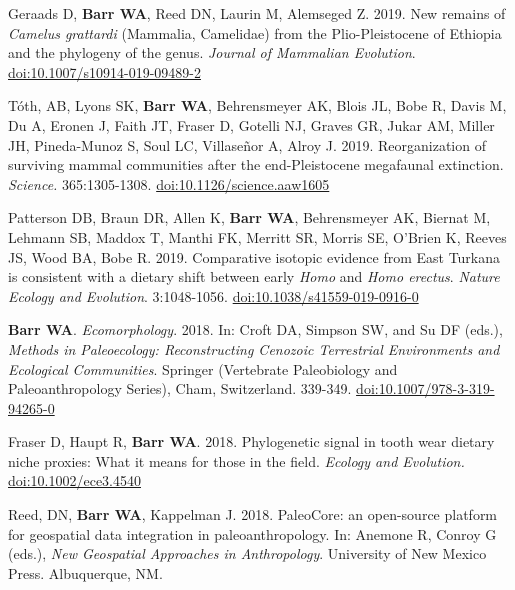 \item Geraads D, {\bfseries Barr WA}, Reed DN, Laurin M, Alemseged Z. 2019. New remains of \emph{Camelus grattardi} (Mammalia, Camelidae) from the Plio-Pleistocene of Ethiopia and the phylogeny of the genus. \emph{Journal of Mammalian Evolution}. \href{https://doi.org/10.1007/s10914-019-09489-2}{doi:10.1007/s10914-019-09489-2}

\item Tóth, AB, Lyons SK, {\bfseries Barr WA}, Behrensmeyer AK, Blois JL, Bobe R, Davis M, Du A, Eronen J, Faith JT, Fraser D, Gotelli NJ, Graves GR, Jukar AM, Miller JH, Pineda-Munoz S, Soul LC, Villaseñor A, Alroy J. 2019. Reorganization of surviving mammal communities after the end-Pleistocene megafaunal extinction. \emph{Science.} 365:1305-1308. \href{https://dx.doi.org/10.1126/science.aaw1605 }{doi:10.1126/science.aaw1605}

\item Patterson DB, Braun DR, Allen K, {\bfseries Barr WA}, Behrensmeyer AK, Biernat M, Lehmann SB, Maddox T, Manthi FK, Merritt SR, Morris SE, O'Brien K, Reeves JS, Wood BA, Bobe R. 2019. Comparative isotopic evidence from East Turkana is consistent with a dietary shift between early \emph{Homo} and \emph{Homo erectus}. \emph{Nature Ecology and Evolution}. 3:1048-1056. \href{https://dx.doi.org/10.1038/s41559-019-0916-0}{doi:10.1038/s41559-019-0916-0}

\item {\bfseries Barr WA}. \emph{Ecomorphology}. 2018. In: Croft DA, Simpson SW, and Su DF (eds.), \emph{Methods in Paleoecology: Reconstructing Cenozoic Terrestrial Environments and Ecological Communities}. Springer (Vertebrate Paleobiology and Paleoanthropology Series), Cham, Switzerland.  339-349. \href{https://doi.org/10.1007/978-3-319-94265-0}{doi:10.1007/978-3-319-94265-0}

\item Fraser D, Haupt R,  {\bfseries Barr WA}. 2018. Phylogenetic signal in tooth wear dietary niche proxies: What it means for those in the field. \emph{Ecology and Evolution.} \href{https://dx.doi.org/10.1002/ece3.4540}{doi:10.1002/ece3.4540}


\item  Reed, DN, {\bfseries Barr WA}, Kappelman J. 2018. PaleoCore: an open-source platform for geospatial data integration in paleoanthropology. In: Anemone R, Conroy G (eds.), \emph{New Geospatial Approaches in Anthropology}. University of New Mexico Press. Albuquerque, NM.

